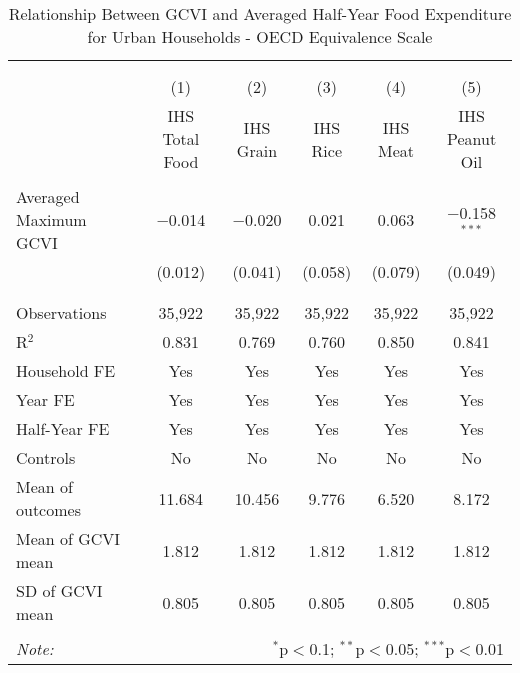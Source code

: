 
\begin{table}[!htbp] \centering 
  \caption{Relationship Between GCVI and Averaged Half-Year Food Expenditure for Urban Households - OECD Equivalence Scale} 
  \label{gcvi_table_6_rural.tex} 
\normalsize 
\begin{tabular}{@{\extracolsep{5pt}}lccccc} 
\\[-1.8ex]\hline 
\hline \\[-1.8ex] 
\\[-1.8ex] & (1) & (2) & (3) & (4) & (5)\\ 
 & IHS Total Food & IHS Grain & IHS Rice & IHS Meat & IHS Peanut Oil \\ 
\hline \\[-1.8ex] 
 Averaged Maximum GCVI & $-$0.014 & $-$0.020 & 0.021 & 0.063 & $-$0.158$^{***}$ \\ 
  & (0.012) & (0.041) & (0.058) & (0.079) & (0.049) \\ 
  & & & & & \\ 
\hline \\[-1.8ex] 
Observations & 35,922 & 35,922 & 35,922 & 35,922 & 35,922 \\ 
R$^{2}$ & 0.831 & 0.769 & 0.760 & 0.850 & 0.841 \\ 
Household FE & Yes & Yes & Yes & Yes & Yes \\ 
Year FE & Yes & Yes & Yes & Yes & Yes \\ 
Half-Year FE & Yes & Yes & Yes & Yes & Yes \\ 
Controls & No & No & No & No & No \\ 
Mean of outcomes & 11.684 & 10.456 & 9.776 & 6.520 & 8.172 \\ 
Mean of GCVI mean & 1.812 & 1.812 & 1.812 & 1.812 & 1.812 \\ 
SD of GCVI mean & 0.805 & 0.805 & 0.805 & 0.805 & 0.805 \\ 
\hline \\[-1.8ex] 
\textit{Note:}  & \multicolumn{5}{r}{$^{*}$p$<$0.1; $^{**}$p$<$0.05; $^{***}$p$<$0.01} \\ 
\end{tabular} 
\end{table} 
